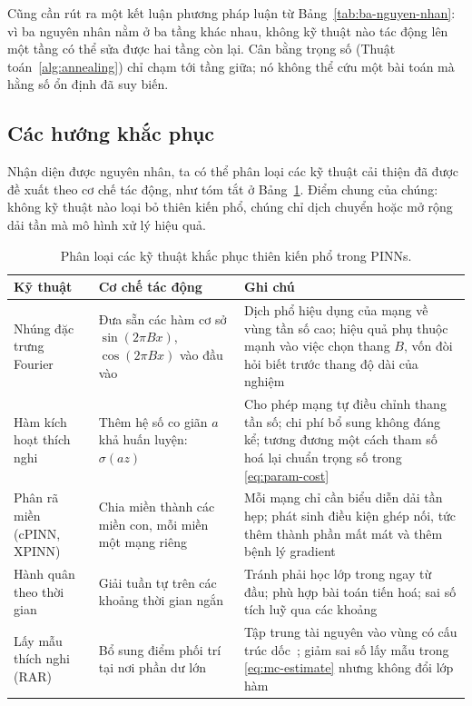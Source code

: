 Cũng cần rút ra một kết luận phương pháp luận từ Bảng~\ref{tab:ba-nguyen-nhan}:
vì ba nguyên nhân nằm ở ba tầng khác nhau, không kỹ thuật nào tác động lên một
tầng có thể sửa được hai tầng còn lại. Cân bằng trọng số
(Thuật toán~\ref{alg:annealing}) chỉ chạm tới tầng giữa; nó không thể cứu một bài
toán mà hằng số ổn định đã suy biến.
 
\subsection{Các hướng khắc phục}
\label{subsec:khac-phuc}
 
Nhận diện được nguyên nhân, ta có thể phân loại các kỹ thuật cải thiện đã được đề
xuất theo cơ chế tác động, như tóm tắt ở Bảng~\ref{tab:remedies}. Điểm chung của
chúng: không kỹ thuật nào loại bỏ thiên kiến phổ, chúng chỉ dịch chuyển hoặc mở
rộng dải tần mà mô hình xử lý hiệu quả.
 
\begin{table}[htbp]
\centering
\caption{Phân loại các kỹ thuật khắc phục thiên kiến phổ trong PINNs.}
\label{tab:remedies}
\small
\begin{tabular}{@{}p{4.0cm} p{4.0cm} p{5.4cm}@{}}
\toprule
\textbf{Kỹ thuật} & \textbf{Cơ chế tác động} & \textbf{Ghi chú} \\
\midrule
Nhúng đặc trưng Fourier &
Đưa sẵn các hàm cơ sở $\sin(2\pi Bx)$, $\cos(2\pi Bx)$ vào đầu vào &
Dịch phổ hiệu dụng của mạng về vùng tần số cao; hiệu quả phụ thuộc mạnh vào việc
chọn thang $B$, vốn đòi hỏi biết trước thang độ dài của nghiệm \\
\addlinespace
Hàm kích hoạt thích nghi &
Thêm hệ số co giãn $a$ khả huấn luyện: $\sigma(a z)$ &
Cho phép mạng tự điều chỉnh thang tần số; chi phí bổ sung không đáng kể; tương
đương một cách tham số hoá lại chuẩn trọng số trong \eqref{eq:param-cost} \\
\addlinespace
Phân rã miền (cPINN, XPINN) &
Chia miền thành các miền con, mỗi miền một mạng riêng &
Mỗi mạng chỉ cần biểu diễn dải tần hẹp; phát sinh điều kiện ghép nối, tức thêm
thành phần mất mát và thêm bệnh lý gradient \\
\addlinespace
Hành quân theo thời gian &
Giải tuần tự trên các khoảng thời gian ngắn &
Tránh phải học lớp trong ngay từ đầu; phù hợp bài toán tiến hoá; sai số tích luỹ
qua các khoảng \\
\addlinespace
Lấy mẫu thích nghi (RAR) &
Bổ sung điểm phối trí tại nơi phần dư lớn &
Tập trung tài nguyên vào vùng có cấu trúc dốc~\cite{lu2021}; giảm sai số lấy mẫu
trong \eqref{eq:mc-estimate} nhưng không đổi lớp hàm \\
\bottomrule
\end{tabular}
\end{table}
 
